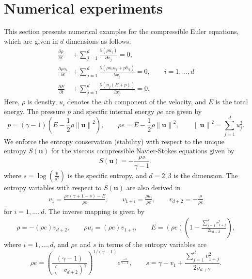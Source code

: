 \documentclass{svjour3}                     %
\newcommand{\pd}[2]{\frac{\partial#1}{\partial#2}}
\newcommand{\nor}[1]{\left\| #1 \right\|}
\newcommand{\LRp}[1]{\left( #1 \right)}
\renewcommand{\note}[1]{{\color{blue}{#1}}}
\begin{document}

\section{Numerical experiments}
\label{sec:4}
This section presents numerical examples for the compressible Euler equations, which are given in $d$ dimensions as follows:
\begin{align*}
\pd{\rho}{t} &+ {\sum_{j=1}^d \pd{\LRp{\rho {u}_j}}{x_j}} = 0,\\
{\pd{\rho {u}_i}{t}} &+ {\sum_{j=1}^d \pd{\LRp{\rho u_iu_j + p\delta_{ij} }}{x_j}} = 0, \qquad i = 1,\ldots,d\\
\pd{E}{t} &+ {\sum_{j=1}^d \pd{\LRp{{u}_j(E+p)}}{x_j}} = 0.\nonumber
\end{align*}
Here, $\rho$ is density, $u_i$ denotes the $i$th component of the velocity, and $E$ is the total energy.  The pressure $p$ and specific internal energy $\rho e$ are given by 
\[
{p = (\gamma-1)\LRp{E - \frac{1}{2}\rho \nor{\bm{u}}^2}}, \qquad {\rho e = E - \frac{1}{2}\rho \nor{\bm{u}}^2}, \qquad \nor{\bm{u}}^2 = {\sum_{j=1}^d u_j^2}.
\]
We enforce the entropy conservation (stability) with respect to the unique entropy $S(\bm{u})$ for the viscous compressible Navier-Stokes equations \cite{hughes1986new} given by
\begin{equation*}
S(\bm{u}) = -\frac{\rho s}{\gamma-1}, 
\end{equation*}
where $s = \log\LRp{\frac{p}{\rho^\gamma}}$ is the specific entropy, and $d = 2,3$ is the dimension.  The entropy variables with respect to $S(\bm{u})$ are also derived in \cite{hughes1986new} 
\begin{align*}
v_1 = \frac{\rho e (\gamma + 1 - s) - E}{\rho e}, \qquad v_{1+ i}= \frac{\rho {{u}_i}}{\rho e}, \qquad v_{d+2} = -\frac{\rho}{\rho e}
\end{align*}
for $i = 1,\ldots, d$.  The inverse mapping is given by
\begin{align*}
\rho = -(\rho e) v_{d+2}, \qquad 
\rho {u_i} = (\rho e) v_{1+i}, \qquad 
 E = (\rho e)\LRp{1 - \frac{\sum_{j=1}^d{v_{1+j}^2}}{2 v_{d+2}}},
\end{align*}
where $i = 1,\ldots,d$, and $\rho e$ and $s$ in terms of the entropy variables are 
\begin{equation*}
\rho e = \LRp{\frac{(\gamma-1)}{\LRp{-v_{d+2}}^{\gamma}}}^{1/(\gamma-1)}e^{\frac{-s}{\gamma-1}}, \qquad 
s = \gamma - v_1 + \frac{\sum_{j=1}^d{v_{1+j}^2}}{2v_{d+2}}.
\end{equation*}
\end{document}
